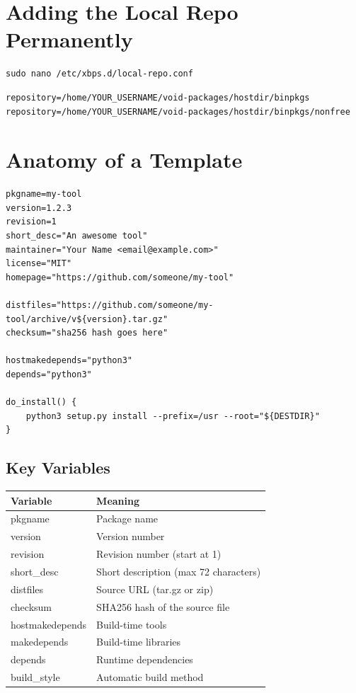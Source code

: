\documentclass[12pt, a4paper]{book}
\begin{document}
\section{Adding the Local Repo Permanently}
\begin{lstlisting}
sudo nano /etc/xbps.d/local-repo.conf
\end{lstlisting}

\begin{lstlisting}
repository=/home/YOUR_USERNAME/void-packages/hostdir/binpkgs
repository=/home/YOUR_USERNAME/void-packages/hostdir/binpkgs/nonfree
\end{lstlisting}

\section{Anatomy of a Template}

\begin{lstlisting}
pkgname=my-tool
version=1.2.3
revision=1
short_desc="An awesome tool"
maintainer="Your Name <email@example.com>"
license="MIT"
homepage="https://github.com/someone/my-tool"

distfiles="https://github.com/someone/my-tool/archive/v${version}.tar.gz"
checksum="sha256 hash goes here"

hostmakedepends="python3"
depends="python3"

do_install() {
    python3 setup.py install --prefix=/usr --root="${DESTDIR}"
}
\end{lstlisting}

\subsection{Key Variables}

\begin{center}
\begin{tabularx}{0.9\textwidth}{lL}
\toprule
\textbf{Variable} & \textbf{Meaning} \\
\midrule
pkgname        & Package name \\
version        & Version number \\
revision       & Revision number (start at 1) \\
short\_desc    & Short description (max 72 characters) \\
distfiles      & Source URL (tar.gz or zip) \\
checksum       & SHA256 hash of the source file \\
hostmakedepends & Build-time tools \\
makedepends    & Build-time libraries \\
depends        & Runtime dependencies \\
build\_style   & Automatic build method \\
\bottomrule
\end{tabularx}
\end{center}
\end{document}
